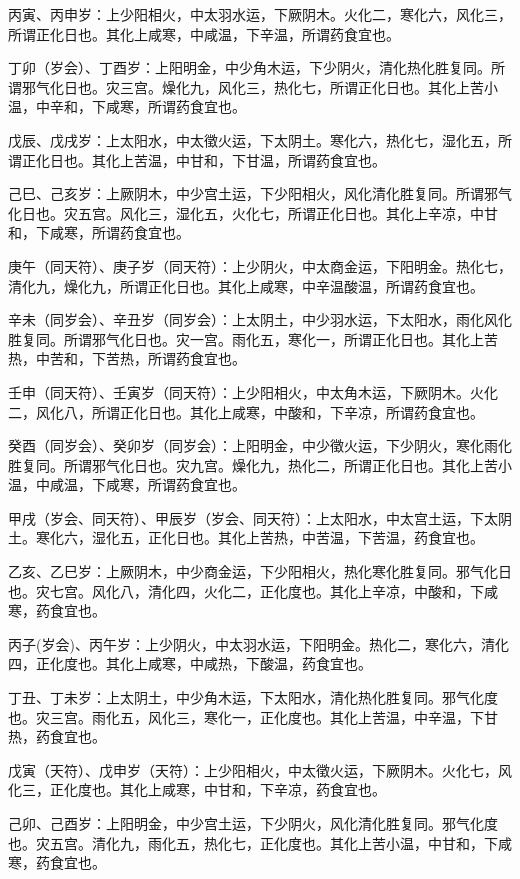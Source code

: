 \documentclass{article}%
\begin{document}
丙寅、丙申岁：上少阳相火，中太羽水运，下厥阴木。火化二，寒化六，风化三，所谓正化日也。其化上咸寒，中咸温，下辛温，所谓药食宜也。

丁卯（岁会）、丁酉岁：上阳明金，中少角木运，下少阴火，清化热化胜复同。所谓邪气化日也。灾三宫。燥化九，风化三，热化七，所谓正化日也。其化上苦小温，中辛和，下咸寒，所谓药食宜也。

戊辰、戊戌岁：上太阳水，中太徵火运，下太阴土。寒化六，热化七，湿化五，所谓正化日也。其化上苦温，中甘和，下甘温，所谓药食宜也。

己巳、己亥岁：上厥阴木，中少宫土运，下少阳相火，风化清化胜复同。所谓邪气化日也。灾五宫。风化三，湿化五，火化七，所谓正化日也。其化上辛凉，中甘和，下咸寒，所谓药食宜也。

庚午（同天符）、庚子岁（同天符）：上少阴火，中太商金运，下阳明金。热化七，清化九，燥化九，所谓正化日也。其化上咸寒，中辛温酸温，所谓药食宜也。

辛未（同岁会）、辛丑岁（同岁会）：上太阴土，中少羽水运，下太阳水，雨化风化胜复同。所谓邪气化日也。灾一宫。雨化五，寒化一，所谓正化日也。其化上苦热，中苦和，下苦热，所谓药食宜也。

壬申（同天符）、壬寅岁（同天符）：上少阳相火，中太角木运，下厥阴木。火化二，风化八，所谓正化日也。其化上咸寒，中酸和，下辛凉，所谓药食宜也。

癸酉（同岁会）、癸卯岁（同岁会）：上阳明金，中少徵火运，下少阴火，寒化雨化胜复同。所谓邪气化日也。灾九宫。燥化九，热化二，所谓正化日也。其化上苦小温，中咸温，下咸寒，所谓药食宜也。

甲戌（岁会、同天符）、甲辰岁（岁会、同天符）：上太阳水，中太宫土运，下太阴土。寒化六，湿化五，正化日也。其化上苦热，中苦温，下苦温，药食宜也。

乙亥、乙巳岁：上厥阴木，中少商金运，下少阳相火，热化寒化胜复同。邪气化日也。灾七宫。风化八，清化四，火化二，正化度也。其化上辛凉，中酸和，下咸寒，药食宜也。

丙子(岁会)、丙午岁：上少阴火，中太羽水运，下阳明金。热化二，寒化六，清化四，正化度也。其化上咸寒，中咸热，下酸温，药食宜也。

丁丑、丁未岁：上太阴土，中少角木运，下太阳水，清化热化胜复同。邪气化度也。灾三宫。雨化五，风化三，寒化一，正化度也。其化上苦温，中辛温，下甘热，药食宜也。

戊寅（天符）、戊申岁（天符）：上少阳相火，中太徵火运，下厥阴木。火化七，风化三，正化度也。其化上咸寒，中甘和，下辛凉，药食宜也。

己卯、己酉岁：上阳明金，中少宫土运，下少阴火，风化清化胜复同。邪气化度也。灾五宫。清化九，雨化五，热化七，正化度也。其化上苦小温，中甘和，下咸寒，药食宜也。
\end{document}
